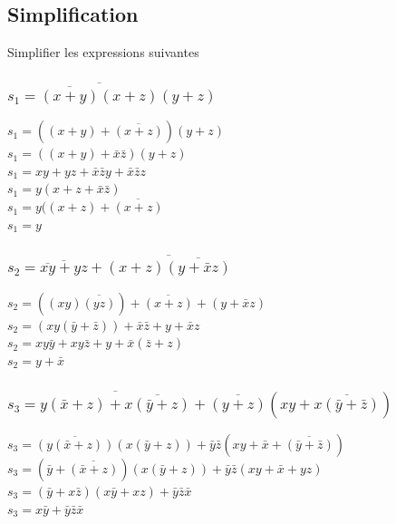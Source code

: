 \documentclass[10pt,a4paper]{article}
\begin{document}
\subsection{Simplification}
Simplifier les expressions suivantes
\subsubsection{$s_{1} = \overline{\overline{(x+y)}(x+z)}(y+z)$}
\begin{flushleft}
$s_{1} = ((x+y)+\overline{(x+z)})(y+z)$ \\
$s_{1} = ((x+y)+\bar{x}\bar{z})(y+z)$ \\
$s_{1} = xy+yz+\bar{x}\bar{z}y+ \bar{x}\bar{z}z$ \\
$s_{1} = y(x+z+\bar{x}\bar{z})$ \\
$s_{1} = y((x+z)+\overline{(x+z)}$\\
$s_{1} = y$\\
\end{flushleft}

\subsubsection{$s_{2} = \overline{\overline{xy}+yz}+ \overline{(x+z)\overline{(y+\bar{x}z)}}$}
\begin{flushleft}
$s_{2} = ((xy)\overline{(yz)}) + \overline{(x+z)}+(y+\bar{x}z)$ \\
$s_{2} = (xy(\bar{y}+\bar{z})) + \bar{x}\bar{z}+y+\bar{x}z$ \\
$s_{2} = xy\bar{y}+xy\bar{z}+ y + \bar{x}(\bar{z}+z)$ \\
$s_{2} = y + \bar{x}$ \\
\end{flushleft}

\subsubsection{$s_{3} = \overline{y(\bar{x}+z)+ \overline{x(\bar{y}+z)}}+\overline{(y+z)}(xy+\overline{x(\bar{y}+\bar{z})})$}
\begin{flushleft}
$s_{3} = \overline{(y(\bar{x}+z))}(x(\bar{y}+z))+\bar{y}\bar{z}(xy+\bar{x}+\overline{(\bar{y}+\bar{z})})$ \\
$s_{3} = (\bar{y}+\overline{(\bar{x}+z)})(x(\bar{y}+z))+\bar{y}\bar{z}(xy+\bar{x}+yz)$ \\
$s_{3} = (\bar{y}+x\bar{z})(x\bar{y}+xz)+\bar{y}\bar{z}\bar{x}$ \\
$s_{3} = x\bar{y}+ \bar{y}\bar{z}\bar{x}$ \\
\end{flushleft}
\end{document}
